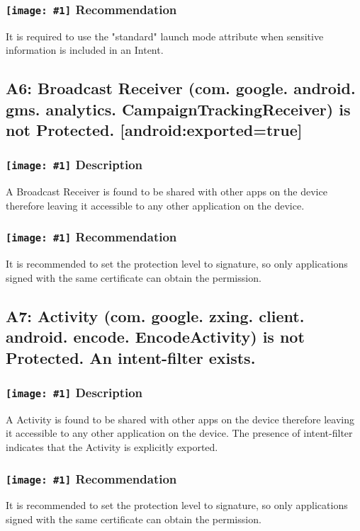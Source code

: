 \documentclass[12p]{article}
\newcommand{\icon}[1]{\texttt{[image: \#1]}}
\begin{document}
\subsubsection*{\protect\icon{/home/miki/Documents/GITHUB/AndroidPermissions/python/vulns/report_icons/basic_todo.png} Recommendation}
It is required to use the "standard" launch mode attribute when sensitive information is included in an Intent.
\subsection{A6: Broadcast Receiver (com. google. android. gms. analytics. CampaignTrackingReceiver) is not Protected. [android:exported=true]}
\subsubsection*{\protect\icon{/home/miki/Documents/GITHUB/AndroidPermissions/python/vulns/report_icons/basic_sheet.png} Description}
A Broadcast Receiver is found to be shared with other apps on the device therefore leaving it accessible to any other application on the device.
\subsubsection*{\protect\icon{/home/miki/Documents/GITHUB/AndroidPermissions/python/vulns/report_icons/basic_todo.png} Recommendation}
It is recommended to set the protection level to signature, so only applications signed with the same certificate can obtain the permission.
\subsection{A7: Activity (com. google. zxing. client. android. encode. EncodeActivity) is not Protected. An intent-filter exists.}
\subsubsection*{\protect\icon{/home/miki/Documents/GITHUB/AndroidPermissions/python/vulns/report_icons/basic_sheet.png} Description}
A  Activity is found to be shared with other apps on the device therefore leaving it accessible to any other application on the device. The presence of intent-filter indicates that the Activity is explicitly exported.
\subsubsection*{\protect\icon{/home/miki/Documents/GITHUB/AndroidPermissions/python/vulns/report_icons/basic_todo.png} Recommendation}
It is recommended to set the protection level to signature, so only applications signed with the same certificate can obtain the permission.
\end{document}
